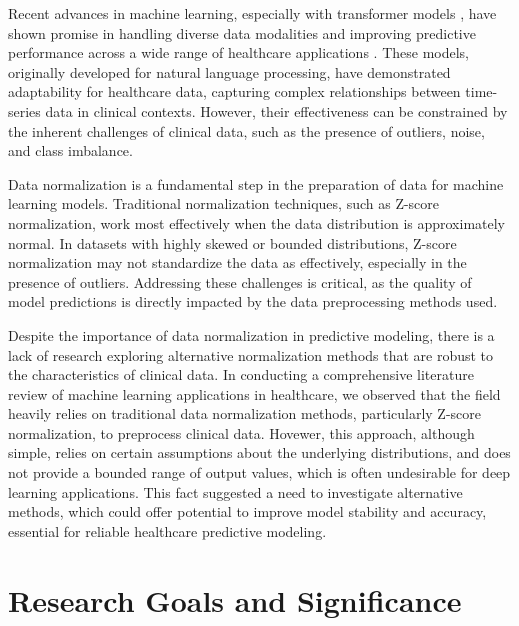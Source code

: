 Recent advances in machine learning, especially with transformer models \cite{bashath2022data}, have shown promise in handling diverse data modalities and improving predictive performance across a wide range of healthcare applications \cite{TransformersHealthcareSurvey2023}. These models, originally developed for natural language processing, have demonstrated adaptability for healthcare data, capturing complex relationships between time-series data in clinical contexts. However, their effectiveness can be constrained by the inherent challenges of clinical data, such as the presence of outliers, noise, and class imbalance.

Data normalization is a fundamental step in the preparation of data for machine learning models. Traditional normalization techniques, such as Z-score normalization, work most effectively when the data distribution is approximately normal. In datasets with highly skewed or bounded distributions, Z-score normalization may not standardize the data as effectively, especially in the presence of outliers. Addressing these challenges is critical, as the quality of model predictions is directly impacted by the data preprocessing methods used.


Despite the importance of data normalization in predictive modeling, there is a lack of research exploring alternative normalization methods that are robust to the characteristics of clinical data. In conducting a comprehensive literature review of machine learning applications in healthcare, we observed that the field heavily relies on traditional data normalization methods, particularly Z-score normalization, to preprocess clinical data. Hovewer, this approach, although simple, relies on certain assumptions about the underlying distributions, and does not provide a bounded range of output values, which is often undesirable for deep learning applications. This fact suggested a need to investigate alternative methods, which could offer potential to improve model stability and accuracy, essential for reliable healthcare predictive modeling.


\section{Research Goals and Significance}

